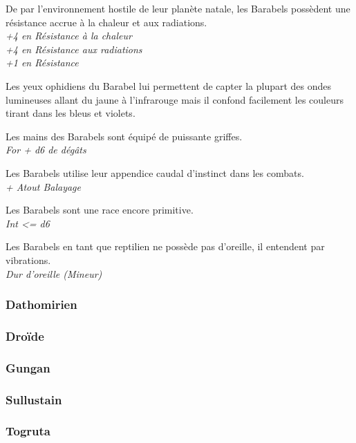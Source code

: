 \begin{description}[align=left]
\item [Enfance difficile] 	%
		De par l'environnement hostile de leur planète natale, les Barabels possèdent une résistance accrue à la chaleur et aux radiations.\\
		\emph{+4 en Résistance à la chaleur}\\
		\emph{+4 en Résistance aux radiations}\\
		\emph{+1 en Résistance}\\
\item [\OE{il} Ophidien] 	%
		Les yeux ophidiens du Barabel lui permettent de capter la plupart des ondes lumineuses allant du jaune à l'infrarouge mais il confond facilement les couleurs tirant dans les bleus et violets.
\item [Arme naturelle]		%
		Les mains des Barabels sont équipé de puissante griffes.\\
		\emph{For + d6 de dégâts}
\item [Balayage]			%
		Les Barabels utilise leur appendice caudal d'instinct dans les combats.\\
		\emph{+ Atout Balayage}
\item [Primitif]			%
		Les Barabels sont une race encore primitive.\\
		\emph{Int <= d6}
\item [Dur d'oreille]		%
		Les Barabels en tant que reptilien ne possède pas d'oreille, il entendent par vibrations.\\
		\emph{Dur d'oreille (Mineur)}
\end{description}

\subsubsection{Dathomirien}
\subsubsection{Droïde}
\subsubsection{Gungan}
\subsubsection{Sullustain}
\subsubsection{Togruta}
